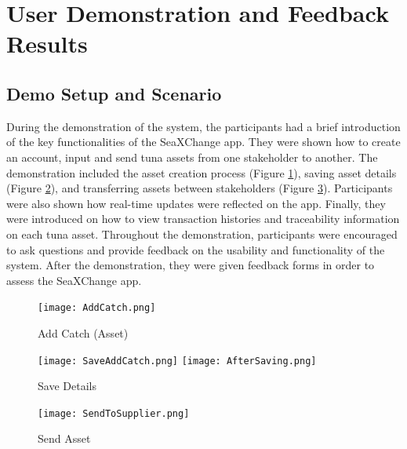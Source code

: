 \section{User Demonstration and Feedback Results}
\subsection{Demo Setup and Scenario}
During the demonstration of the system, the participants had a brief introduction of the key functionalities of the SeaXChange app. They were shown how to create an account, input and send tuna assets from one stakeholder to another. The demonstration included the asset creation process (Figure \ref{fig:add_catch}), saving asset details (Figure \ref{fig:save_details}), and transferring assets between stakeholders (Figure \ref{fig:sendto_supplier}). Participants were also shown how real-time updates were reflected on the app. Finally, they were introduced on how to view transaction histories and traceability information on each tuna asset. Throughout the demonstration, participants were encouraged to ask questions and provide feedback on the usability and functionality of the system. After the demonstration, they were given feedback forms in order to assess the SeaXChange app. 

\begin{figure}[H]
	\centering
	\texttt{[image: AddCatch.png]}
	\caption{Add Catch (Asset)}
	\label{fig:add_catch}
\end{figure}

\begin{figure}[H]
	\centering
	\texttt{[image: SaveAddCatch.png]}
	\hfill
	\texttt{[image: AfterSaving.png]}
	\caption{Save Details}
	\label{fig:save_details}
\end{figure}

\begin{figure}[H]
	\centering
	\texttt{[image: SendToSupplier.png]}
	\caption{Send Asset}
	\label{fig:sendto_supplier}
\end{figure}


